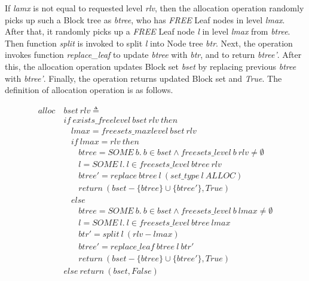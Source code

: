 If \emph{lamx} is not equal to requested level \emph{rlv}, then the allocation operation randomly picks up such a Block tree as \emph{btree}, who has \emph{FREE} Leaf nodes in level \emph{lmax}. After that, it randomly picks up a \emph{FREE} Leaf node \emph{l} in level \emph{lmax} from \emph{btree}. Then function \emph{split} is invoked to split \emph{l} into Node tree \emph{btr}. Next, the operation invokes function \emph{replace\_leaf} to update \emph{btree} with \emph{btr}, and to return \emph{btree'}. After this, the allocation operation updates Block set \emph{bset} by replacing previous \emph{btree} with \emph{btree'}. Finally, the operation returns updated Block set and \emph{True}. The definition of allocation operation is as follows.

\begin{definition} 
\end{definition}
\vspace{-7pt}
{\footnotesize
\begin{align*}
alloc\ &bset\ rlv \triangleq \\
&if\ exists\_freelevel\ bset\ rlv\ then \\
&\ \ \ \ lmax = freesets\_maxlevel\ bset\ rlv \\
&\ \ \ \ if\ lmax = rlv\ then \\
&\ \ \ \ \ \ \ \ btree = SOME\ b.\ b \in bset \wedge freesets\_level\ b\ rlv \ne \emptyset \\
&\ \ \ \ \ \ \ \ l = SOME\ l.\ l \in freesets\_level\ btree\ rlv \\
&\ \ \ \ \ \ \ \ btree' = replace\ btree\ l\ (set\_type\ l\ ALLOC) \\
&\ \ \ \ \ \ \ \ return\ (bset - \lbrace btree \rbrace \cup \lbrace btree' \rbrace, True) \\
&\ \ \ \ else \\
&\ \ \ \ \ \ \ \ btree = SOME\ b.\ b \in bset \wedge freesets\_level\ b\ lmax \ne \emptyset \\
&\ \ \ \ \ \ \ \ l = SOME\ l.\ l \in freesets\_level\ btree\ lmax \\
&\ \ \ \ \ \ \ \ btr' = split\ l\ (rlv - lmax) \\
&\ \ \ \ \ \ \ \ btree' = replace\_leaf\ btree\ l\ btr' \\
&\ \ \ \ \ \ \ \ return\ (bset - \lbrace btree \rbrace \cup \lbrace btree' \rbrace, True) \\
&else\ return\ (bset, False)
\end{align*}
}
\vspace{-17pt}

